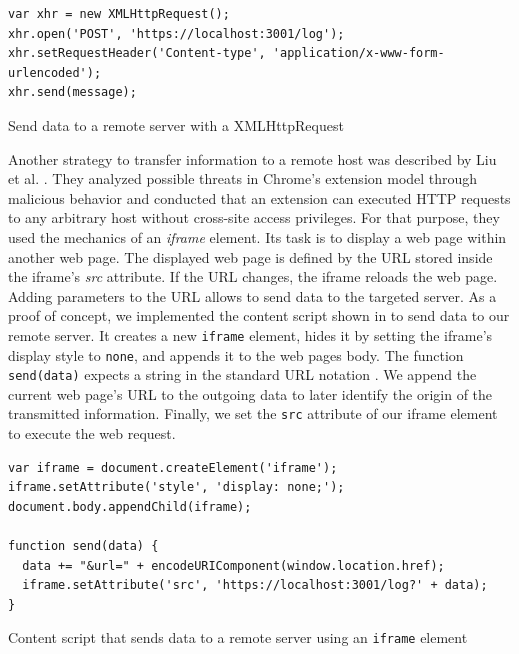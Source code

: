 		\begin{code}
			\begin{lstlisting}
var xhr = new XMLHttpRequest();
xhr.open('POST', 'https://localhost:3001/log');
xhr.setRequestHeader('Content-type', 'application/x-www-form-urlencoded');
xhr.send(message);
			\end{lstlisting}
			\caption{Send data to a remote server with a XMLHttpRequest}
			\label{xhrSendData}
		\end{code}
		
		Another strategy to transfer information to a remote host was described by Liu et al. \cite{Liu12chromeextensions:}. They analyzed possible threats in Chrome's extension model through malicious behavior and conducted that an extension can executed HTTP requests to any arbitrary host without cross-site access privileges. For that purpose, they used the mechanics of an \textit{iframe} element. Its task is to display a web page within another web page. The displayed web page is defined by the URL stored inside the iframe's \textit{src} attribute. If the URL changes, the iframe reloads the web page. Adding parameters to the URL allows to send data to the targeted server. As a proof of concept, we implemented the content script shown in  to send data to our remote server. It creates a new \texttt{iframe} element, hides it by setting the iframe's display style to \texttt{none}, and appends it to the web pages body. The function \texttt{send(data)} expects a string in the standard URL notation \cite{w3cUrlSpecifications}. We append the current web page's URL to the outgoing data to later identify the origin of the transmitted information. Finally, we set the \texttt{src} attribute of our iframe element to execute the web request. \\
		
		\begin{code}
			\begin{lstlisting}
var iframe = document.createElement('iframe');
iframe.setAttribute('style', 'display: none;');
document.body.appendChild(iframe);

function send(data) {
  data += "&url=" + encodeURIComponent(window.location.href);
  iframe.setAttribute('src', 'https://localhost:3001/log?' + data);
}
			\end{lstlisting}
			\caption{Content script that sends data to a remote server using an \texttt{iframe} element}
			\label{contentScriptSendDataWithIframe}
		\end{code}
		
